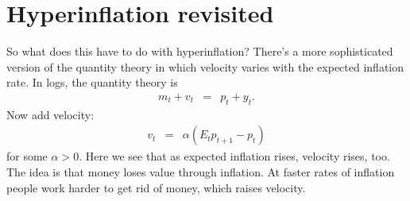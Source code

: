 \documentclass[11pt]{article}
\begin{document}
\begin{comment}
Adam asked how we compute expectations of future (say) dividends in forward-looking models.  In all of our examples, dividends follow some stationary process, which we then used to compute expectations.

Is that reasonable?  I'd say sometimes yes, sometimes no.  What do we do if it's not?  Hard to say.  Here's Robert Lucas on a similar issue, the impact of monetary policy:

Page 199:
I take the purpose of this session to be to elicit views on economic
policy from economists of different points of view. The title
of the session, “Macroeconomic Policy, 1974/75 : What Should Have
Been Done?” does not seem to me useful for this purpose.

What he means, I think, is that we need to know more about future policy to be able to assess the impact of current policy.  How much more?

Page 205:
[O]ur ability as economists to predict the responses of
agents rests, in situations where expectations about the future matter,
on our understanding of the stochastic environment agents believe themselves
to be operating in. In practice, this limits the class of policies the
consequences of which we can hope to assess in advance to policies
generated by fixed, well understood, relatively permanent rules (or functions
relating policy actions taken to the state of the economy).

That is:  without some "understanding of the stochastic environment" it's impossible to say what agents should expect, and therefore impossible to say what the impact will be.

Here's the whole thing:  http://www.nber.org/chapters/c6264.pdf
\end{comment} 



\section{Hyperinflation revisited}

So what does this have to do with hyperinflation?
There's a more sophisticated version of the quantity theory in which
velocity varies with the expected inflation rate.
In logs, the quantity theory is
\begin{eqnarray*}
    m_t + v_t &=& p_t + y_t .
\end{eqnarray*}
Now add velocity:
\begin{eqnarray*}
    v_t &=& \alpha (E_t p_{t+1} - p_t )
\end{eqnarray*}
for some $\alpha > 0$.
Here we see that as expected inflation rises,
velocity rises, too.
The idea is that money loses value through inflation.
At faster rates of inflation people work harder to get rid of money,
which raises velocity.
\end{document}
